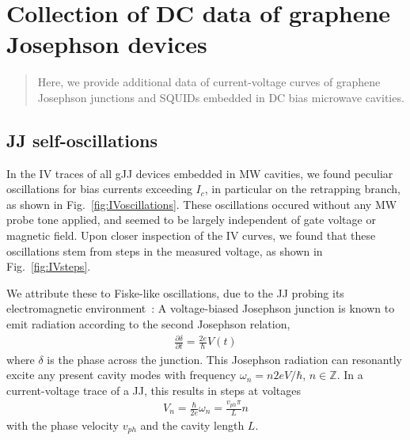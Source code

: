 \newchapstyle
\chapter{Collection of DC data of graphene Josephson devices}
\label{chap:gJJ-misc}

%
%
\begin{abstract}
	\color{title}
	Here, we provide additional data of current-voltage curves of graphene Josephson junctions and SQUIDs embedded in DC bias microwave cavities.
\end{abstract}

\afterpage{\pagecolor{none}}\newpage

\section{JJ self-oscillations}\label{sec:fiske}
In the IV traces of all gJJ devices embedded in MW cavities, we found peculiar oscillations for bias currents exceeding $I_c$, in particular on the retrapping branch, as shown in Fig.~\ref{fig:IVoscillations}.
%
These oscillations occured without any MW probe tone applied, and seemed to be largely independent of gate voltage or magnetic field.
%
Upon closer inspection of the IV curves, we found that these oscillations stem from steps in the measured voltage, as shown in Fig.~\ref{fig:IVsteps}.

We attribute these to Fiske-like oscillations, due to the JJ probing its electromagnetic environment~\cite{fiskeTemperatureMagneticField1964,eckSelfDetectionAcJosephson1964,coonJosephsonAcStep1965}:
%
A voltage-biased Josephson junction is known to emit radiation according to the second Josephson relation,
%
\begin{align}
\frac{\partial \delta}{\partial t}=\frac{2e}{\hbar}V(t)
\end{align}
%
where $\delta$ is the phase across the junction.
%
This Josephson radiation can resonantly excite any present cavity modes with frequency $\omega_n=n2eV/\hbar$, $n\in\mathbb{Z}$.
%
In a current-voltage trace of a JJ, this results in steps at voltages
%
\begin{align}
V_n=\frac{\hbar}{2e}\omega_n=\frac{v_{ph}\pi}{L}n
\end{align}
%
with the phase velocity $v_{ph}$ and the cavity length $L$.

